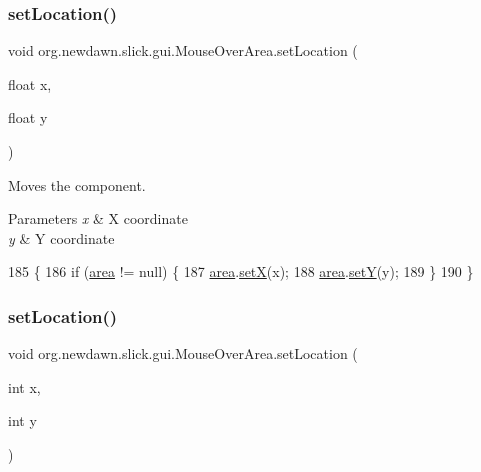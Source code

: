 \subsubsection{\texorpdfstring{set\+Location()}{setLocation()}\hspace{0.1cm}{\footnotesize\ttfamily [1/2]}}
{\footnotesize\ttfamily void org.\+newdawn.\+slick.\+gui.\+Mouse\+Over\+Area.\+set\+Location (\begin{DoxyParamCaption}\item[{float}]{x,  }\item[{float}]{y }\end{DoxyParamCaption})\hspace{0.3cm}{\ttfamily [inline]}}

Moves the component.


\begin{DoxyParams}{Parameters}
{\em x} & X coordinate \\
\hline
{\em y} & Y coordinate \\
\hline
\end{DoxyParams}

\begin{DoxyCode}
185                                               \{
186         \textcolor{keywordflow}{if} (\mbox{\hyperlink{classorg_1_1newdawn_1_1slick_1_1gui_1_1_mouse_over_area_a8104ad89fbe457da294da3285b7a3268}{area}} != null) \{
187             \mbox{\hyperlink{classorg_1_1newdawn_1_1slick_1_1gui_1_1_mouse_over_area_a8104ad89fbe457da294da3285b7a3268}{area}}.\mbox{\hyperlink{classorg_1_1newdawn_1_1slick_1_1geom_1_1_shape_a1469b8ef682642c4257869640c27bf16}{setX}}(x);
188             \mbox{\hyperlink{classorg_1_1newdawn_1_1slick_1_1gui_1_1_mouse_over_area_a8104ad89fbe457da294da3285b7a3268}{area}}.\mbox{\hyperlink{classorg_1_1newdawn_1_1slick_1_1geom_1_1_shape_a7a127d0dea9bd7f0e3ce3fd0a61268fc}{setY}}(y);
189         \}
190     \}
\end{DoxyCode}
\mbox{\label{classorg_1_1newdawn_1_1slick_1_1gui_1_1_mouse_over_area_a4857ffc646aa61fcabfc81a501ce3281}} 
\subsubsection{\texorpdfstring{set\+Location()}{setLocation()}\hspace{0.1cm}{\footnotesize\ttfamily [2/2]}}
{\footnotesize\ttfamily void org.\+newdawn.\+slick.\+gui.\+Mouse\+Over\+Area.\+set\+Location (\begin{DoxyParamCaption}\item[{int}]{x,  }\item[{int}]{y }\end{DoxyParamCaption})\hspace{0.3cm}{\ttfamily [inline]}}

